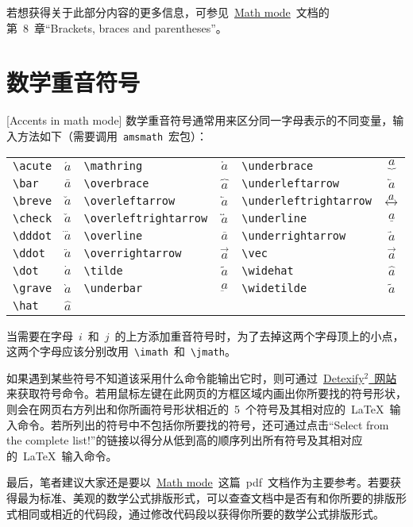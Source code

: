 若想获得关于此部分内容的更多信息，可参见~\href{http://tug.ctan.org/cgi-bin/ctanPackageInformation.py?id=voss-mathmode}{Math mode}~文档的第~8~章“Brackets, braces and parentheses”。

\section{数学重音符号}[Accents in math mode]
数学重音符号通常用来区分同一字母表示的不同变量，输入方法如下（需要调用~\verb|amsmath|~宏包）：

\begin{tabularx}{\textwidth}{Xc|Xc|Xc}
 \verb|\acute| & $\acute{a}$ & \verb|\mathring| & $\mathring{a}$ & \verb|\underbrace| & $\underbrace{a}$ \\
 \verb|\bar| & $\bar{a}$ & \verb|\overbrace| & $\overbrace{a}$ & \verb|\underleftarrow| & $\underleftarrow{a}$ \\
 \verb|\breve| & $\breve{a}$ & \verb|\overleftarrow| & $\overleftarrow{a}$ & \verb|\underleftrightarrow| & $\underleftrightarrow{a}$ \\
 \verb|\check| & $\check{a}$ & \verb|\overleftrightarrow| & $\overleftrightarrow{a}$ & \verb|\underline| & $\underline{a}$ \\
 \verb|\dddot| & $\dddot{a}$ & \verb|\overline| & $\overline{a}$ & \verb|\underrightarrow| & $\underrightarrow{a}$ \\
 \verb|\ddot| & $\ddot{a}$ & \verb|\overrightarrow| & $\overrightarrow{a}$ & \verb|\vec| & $\vec{a}$ \\
 \verb|\dot| & $\dot{a}$ & \verb|\tilde| & $\tilde{a}$ & \verb|\widehat| & $\widehat{a}$ \\
 \verb|\grave| & $\grave{a}$ & \verb|\underbar| & $\underbar{a}$ & \verb|\widetilde| & $\widetilde{a}$ \\
 \verb|\hat| & $\hat{a}$ 
\end{tabularx}

当需要在字母~$i$~和~$j$~的上方添加重音符号时，为了去掉这两个字母顶上的小点，这两个字母应该分别改用~\verb|\imath|~和~\verb|\jmath|。

如果遇到某些符号不知道该采用什么命令能输出它时，则可通过~\href{http://detexify.kirelabs.org/classify.html}{Detexify$^2$~网站}来获取符号命令。若用鼠标左键在此网页的方框区域内画出你所要找的符号形状，则会在网页右方列出和你所画符号形状相近的~5~个符号及其相对应的~\LaTeX~输入命令。若所列出的符号中不包括你所要找的符号，还可通过点击“Select from the complete list!”的链接以得分从低到高的顺序列出所有符号及其相对应的~\LaTeX~输入命令。

最后，笔者建议大家还是要以~\href{http://tug.ctan.org/cgi-bin/ctanPackageInformation.py?id=voss-mathmode}{Math mode}~这篇~pdf~文档作为主要参考。若要获得最为标准、美观的数学公式排版形式，可以查查文档中是否有和你所要的排版形式相同或相近的代码段，通过修改代码段以获得你所要的数学公式排版形式。

